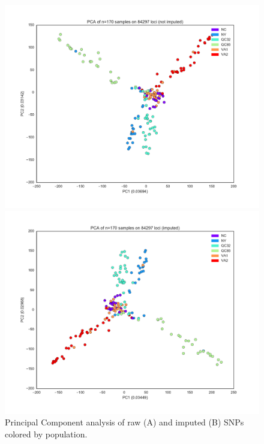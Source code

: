 \documentclass[smallextended]{svjour3}
\begin{document}
\begin{figure}[h]
\begin{minipage}[b]{.5\linewidth}
	\centering
	\includegraphics[width=\textwidth]{not_imputed}	
	\subcaption{}
\end{minipage}
\hfill
\begin{minipage}[b]{.5\linewidth}
	\centering
	\includegraphics[width=\textwidth]{imputed}	
	\subcaption{}
\end{minipage}
\caption{Principal Component analysis of raw (A) and imputed (B) SNPs colored 
by population.}
\label{fig:pcas}
\end{figure}
\end{document}
